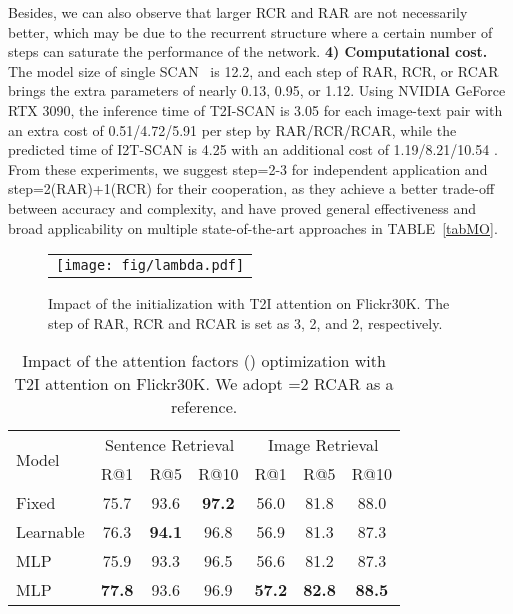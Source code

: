 \documentclass[journal]{IEEEtran}\newcommand{\ignore}[1]{}
\begin{document}
Besides, we can also observe that larger RCR and RAR are not necessarily better, which may be due to the recurrent structure where a certain number of steps can saturate the performance of the network. 
\textbf{4) Computational cost.} The model size of single SCAN~\cite{SCAN} is 12.2, and each step of RAR, RCR, or RCAR brings the extra parameters of nearly 0.13, 0.95, or 1.12.
Using NVIDIA GeForce RTX 3090, the inference time of T2I-SCAN is 3.05  for each image-text pair with an extra cost of 0.51/4.72/5.91  per step by RAR/RCR/RCAR, while the predicted time of I2T-SCAN is 4.25  with an additional cost of 1.19/8.21/10.54 .
From these experiments, we suggest step=2-3 for independent application and step=2(RAR)+1(RCR) for their cooperation, as they achieve a better trade-off between accuracy and complexity, and have proved general effectiveness and broad applicability on multiple state-of-the-art approaches in TABLE~\ref{tabMO}.

\begin{figure}[htpb]
	\centering
	\begin{tabular}{@{}c}
    	\texttt{[image: fig/lambda.pdf]} 
	\end{tabular}
	\caption{Impact of the  initialization with T2I attention on Flickr30K. The step of RAR, RCR and RCAR is set as 3, 2, and 2, respectively.}
	\label{fig:lambda}
\end{figure}

\begin{table}
	\centering
	\caption{Impact of the attention factors () optimization with T2I attention on Flickr30K. We adopt =2 RCAR as a reference.}\label{tabRCRfeedback}
		\begin{tabular}{l|cccccc}
			\hline
			\multirow{2}{*}{Model}
			&\multicolumn{3}{c}{Sentence Retrieval}
			&\multicolumn{3}{c}{Image Retrieval}\\
			&R@1&R@5&R@10&R@1&R@5&R@10\\
			\hline 
			Fixed &75.7&93.6&\bf{97.2}&56.0&81.8&88.0\\
			Learnable &76.3&\bf{94.1}&96.8&56.9&81.3&87.3\\
			MLP &75.9&93.3&96.5&56.6&81.2&87.3\\
		    MLP &\bf{77.8}&93.6&96.9&{\bf57.2}&\bf{82.8}&\bf{88.5}\\
			\hline
		\end{tabular}
\end{table}
\end{document}
